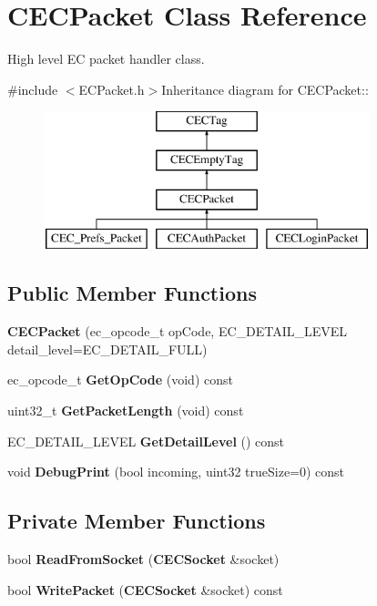 \section{CECPacket Class Reference}
\label{classCECPacket}


High level EC packet handler class.  


{\ttfamily \#include $<$ECPacket.h$>$}Inheritance diagram for CECPacket::\begin{figure}[H]
\begin{center}
\leavevmode
\includegraphics[height=4cm]{classCECPacket}
\end{center}
\end{figure}
\subsection*{Public Member Functions}
\begin{DoxyCompactItemize}
\item 
{\bf CECPacket} (ec\_\-opcode\_\-t opCode, EC\_\-DETAIL\_\-LEVEL detail\_\-level=EC\_\-DETAIL\_\-FULL)\label{classCECPacket_a3aba08458a75540c023a5786cb3d64a5}

\item 
ec\_\-opcode\_\-t {\bf GetOpCode} (void) const 
\item 
uint32\_\-t {\bf GetPacketLength} (void) const 
\item 
EC\_\-DETAIL\_\-LEVEL {\bfseries GetDetailLevel} () const \label{classCECPacket_a33eb20503c6d3b6ba209dbbd01ebbdf9}

\item 
void {\bfseries DebugPrint} (bool incoming, uint32 trueSize=0) const \label{classCECPacket_a62556487c1023ee7457c646571ce6ed4}

\end{DoxyCompactItemize}
\subsection*{Private Member Functions}
\begin{DoxyCompactItemize}
\item 
bool {\bfseries ReadFromSocket} ({\bf CECSocket} \&socket)\label{classCECPacket_a09a940d5808b0f858cb0e115eef048dc}

\item 
bool {\bfseries WritePacket} ({\bf CECSocket} \&socket) const \label{classCECPacket_a4e13efc2fd9175b6c75e10d19fe6d061}

\end{DoxyCompactItemize}
